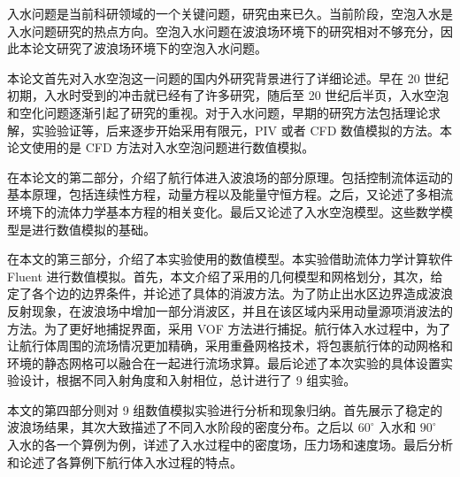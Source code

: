 
\begin{summary}
  入水问题是当前科研领域的一个关键问题，研究由来已久。当前阶段，空泡入水是入水问题研究的热点方向。空泡入水问题在波浪场环境下的研究相对不够充分，因此本论文研究了波浪场环境下的空泡入水问题。

  本论文首先对入水空泡这一问题的国内外研究背景进行了详细论述。早在 20 世纪初期，入水时受到的冲击就已经有了许多研究，随后至 20 世纪后半页，入水空泡和空化问题逐渐引起了研究的重视。对于入水问题，早期的研究方法包括理论求解，实验验证等，后来逐步开始采用有限元，PIV 或者 CFD 数值模拟的方法。本论文使用的是 CFD 方法对入水空泡问题进行数值模拟。

  在本论文的第二部分，介绍了航行体进入波浪场的部分原理。包括控制流体运动的基本原理，包括连续性方程，动量方程以及能量守恒方程。之后，又论述了多相流环境下的流体力学基本方程的相关变化。最后又论述了入水空泡模型。这些数学模型是进行数值模拟的基础。

  在本文的第三部分，介绍了本实验使用的数值模型。本实验借助流体力学计算软件 Fluent 进行数值模拟。首先，本文介绍了采用的几何模型和网格划分，其次，给定了各个边的边界条件，并论述了具体的消波方法。为了防止出水区边界造成波浪反射现象，在波浪场中增加一部分消波区，并且在该区域内采用动量源项消波法的方法。为了更好地捕捉界面，采用 VOF 方法进行捕捉。航行体入水过程中，为了让航行体周围的流场情况更加精确，采用重叠网格技术，将包裹航行体的动网格和环境的静态网格可以融合在一起进行流场求算。最后论述了本次实验的具体设置实验设计，根据不同入射角度和入射相位，总计进行了 9 组实验。

  本文的第四部分则对 9 组数值模拟实验进行分析和现象归纳。首先展示了稳定的波浪场结果，其次大致描述了不同入水阶段的密度分布。之后以 $60 ^\circ$ 入水和 $90 ^\circ$ 入水的各一个算例为例，详述了入水过程中的密度场，压力场和速度场。最后分析和论述了各算例下航行体入水过程的特点。
\end{summary}
